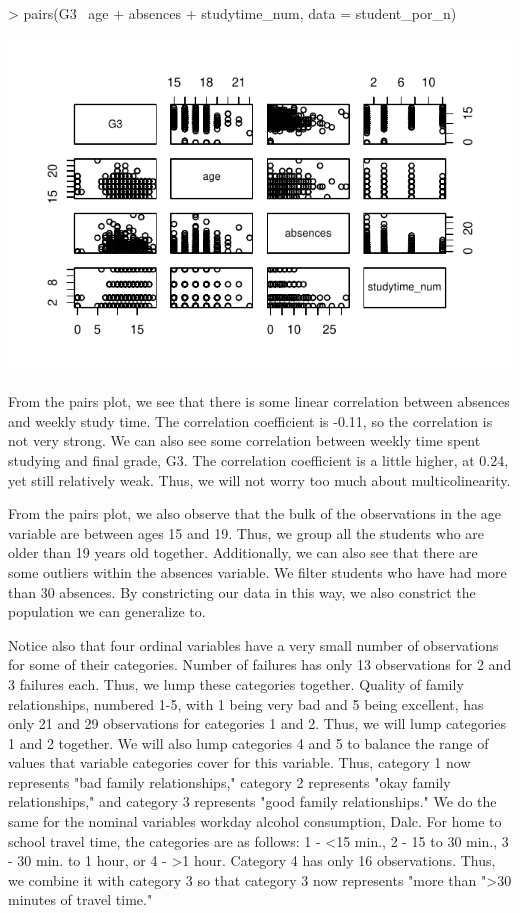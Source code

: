\documentclass{article}
\begin{document}
\begin{Schunk}
\begin{Sinput}
> pairs(G3~ age + absences + studytime_num, data = student_por_n)
\end{Sinput}
\end{Schunk}
\includegraphics{Report_3-003}



From the pairs plot, we see that there is some linear correlation between absences and weekly study time. The correlation coefficient is -0.11, so the correlation is not very strong. We can also see some correlation between weekly time spent studying and final grade, G3. The correlation coefficient is a little higher, at 0.24, yet still relatively weak. Thus, we will not worry too much about multicolinearity.

From the pairs plot, we also observe that the bulk of the observations in the age variable are between ages 15 and 19. Thus, we group all the students who are older than 19 years old together. Additionally, we can also see that there are some outliers within the absences variable. We filter students who have had more than 30 absences. By constricting our data in this way, we also constrict the population we can generalize to. 


Notice also that four ordinal variables have a very small number of observations for some of their categories. Number of failures has only 13 observations for 2 and 3 failures each. Thus, we lump these categories together. Quality of family relationships, numbered 1-5, with 1 being very bad and 5 being excellent, has only 21 and 29 observations for categories 1 and 2. Thus, we will lump categories 1 and 2 together. We will also lump categories 4 and 5 to balance the range of values that variable categories cover for this variable. Thus, category 1 now represents "bad family relationships," category 2 represents "okay family relationships," and category 3 represents "good family relationships." We do the same for the nominal variables workday alcohol consumption, Dalc. For home to school travel time, the categories are as follows: 1 - <15 min., 2 - 15 to 30 min., 3 - 30 min. to 1 hour, or 4 - >1 hour. Category 4 has only 16 observations. Thus, we combine it with category 3 so that category 3 now represents "more than ">30 minutes of travel time."
\end{document}

